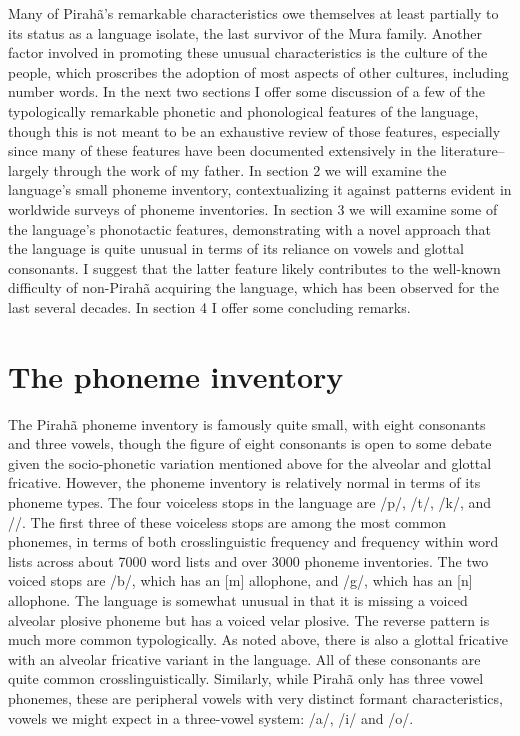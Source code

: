 \documentclass[output=paper,colorlinks,citecolor=brown
]{langscibook}
\begin{document}
    Many of Pirahã’s remarkable characteristics owe themselves at least partially to its status as a language isolate, the last survivor of the Mura family. Another factor involved in promoting these unusual characteristics is the culture of the people, which proscribes the adoption of most aspects of other cultures, including number words.\cite{everett2005cultural} In the next two sections I offer some discussion of a few of the typologically remarkable phonetic and phonological features of the language, though this is not meant to be an exhaustive review of those features, especially since many of these features have been documented extensively in the literature–largely through the work of my father. In section 2 we will examine the language’s small phoneme inventory, contextualizing it against patterns evident in worldwide surveys of phoneme inventories. In section 3 we will examine some of the language’s phonotactic features, demonstrating with a novel approach that the language is quite unusual in terms of its reliance on vowels and glottal consonants. I suggest that the latter feature likely contributes to the well-known difficulty of non-Pirahã acquiring the language, which has been observed for the last several decades. In section 4 I offer some concluding remarks. 


\section{The phoneme inventory}

    The Pirahã phoneme inventory is famously quite small, with eight consonants and three vowels, though the figure of eight consonants is open to some debate given the socio-phonetic variation mentioned above for the alveolar and glottal fricative. However, the phoneme inventory is relatively normal in terms of its phoneme types. The four voiceless stops in the language are /p/, /t/, /k/, and //. The first three of these voiceless stops are among the most common phonemes, in terms of both crosslinguistic frequency and frequency within word lists across about 7000 word lists and over 3000 phoneme inventories.\cite{everett2018similar, everett2021sounds} The two voiced stops are /b/, which has an [m] allophone, and /g/, which has an [n] allophone. The language is somewhat unusual in that it is missing a voiced alveolar plosive phoneme but has a voiced velar plosive. The reverse pattern is much more common typologically.\cite{everett2018global} As noted above, there is also a glottal fricative with an alveolar fricative variant in the language.\cite{everett1986piraha} All of these consonants are quite common crosslinguistically. Similarly, while Pirahã only has three vowel phonemes, these are peripheral vowels with very distinct formant characteristics, vowels we might expect in a three-vowel system: /a/, /i/ and /o/. 
\end{document}

